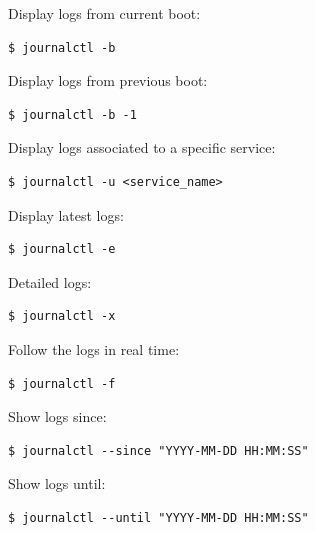 \documentclass{article}
\newenvironment{codetemplate}[1][]{%
  \mybasecolorbox[#1]
  \itshape
}{%
  \endmybasecolorbox
}
\begin{document}
Display logs from current boot:
\begin{codetemplate}{}
\begin{verbatim}
$ journalctl -b 
\end{verbatim}
\end{codetemplate}

Display logs from previous boot:
\begin{codetemplate}{}
\begin{verbatim}
$ journalctl -b -1
\end{verbatim}
\end{codetemplate}

Display logs associated to a specific service:
\begin{codetemplate}{}
\begin{verbatim}
$ journalctl -u <service_name>
\end{verbatim}
\end{codetemplate}

Display latest logs:
\begin{codetemplate}{}
\begin{verbatim}
$ journalctl -e
\end{verbatim}
\end{codetemplate}

Detailed logs:
\begin{codetemplate}{}
\begin{verbatim}
$ journalctl -x
\end{verbatim}
\end{codetemplate}

Follow the logs in real time:
\begin{codetemplate}{}
\begin{verbatim}
$ journalctl -f
\end{verbatim}
\end{codetemplate}

Show logs since:
\begin{codetemplate}{}
\begin{verbatim}
$ journalctl --since "YYYY-MM-DD HH:MM:SS"
\end{verbatim}
\end{codetemplate}

Show logs until:
\begin{codetemplate}{}
\begin{verbatim}
$ journalctl --until "YYYY-MM-DD HH:MM:SS"
\end{verbatim}
\end{codetemplate}
\end{document}

